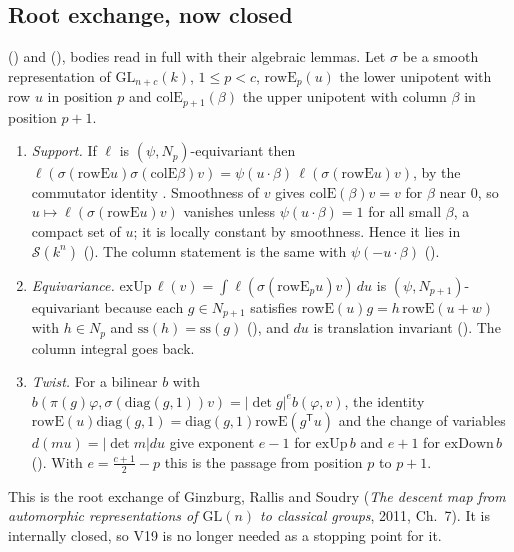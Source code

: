 \documentclass[11pt]{article}
\newcommand{\GL}{\mathrm{GL}}
\newcommand{\Sch}{\mathcal S}
\begin{document}
\subsection{Root exchange, now closed}

 () and  (), bodies read in full with their algebraic lemmas. Let $\sigma$ be a smooth representation of $\GL_{n+c}(k)$, $1\le p<c$, $\mathrm{rowE}_p(u)$ the lower unipotent with row $u$ in position $p$ and $\mathrm{colE}_{p+1}(\beta)$ the upper unipotent with column $\beta$ in position $p+1$.
\begin{enumerate}[leftmargin=*,itemsep=2pt]
\item \emph{Support.} If $\ell$ is $(\psi,N_p)$-equivariant then $\ell(\sigma(\mathrm{rowE}u)\sigma(\mathrm{colE}\beta)v)=\psi(u\cdot\beta)\,\ell(\sigma(\mathrm{rowE}u)v)$, by the commutator identity . Smoothness of $v$ gives $\mathrm{colE}(\beta)v=v$ for $\beta$ near $0$, so $u\mapsto\ell(\sigma(\mathrm{rowE}u)v)$ vanishes unless $\psi(u\cdot\beta)=1$ for all small $\beta$, a compact set of $u$; it is locally constant by smoothness. Hence it lies in $\Sch(k^n)$ (). The column statement is the same with $\psi(-u\cdot\beta)$ ().
\item \emph{Equivariance.} $\mathrm{exUp}\,\ell(v)=\int\ell(\sigma(\mathrm{rowE}_pu)v)\,du$ is $(\psi,N_{p+1})$-equivariant because each $g\in N_{p+1}$ satisfies $\mathrm{rowE}(u)g=h\,\mathrm{rowE}(u+w)$ with $h\in N_p$ and $\mathrm{ss}(h)=\mathrm{ss}(g)$ (), and $du$ is translation invariant (). The column integral goes back.
\item \emph{Twist.} For a bilinear $b$ with $b(\pi(g)\varphi,\sigma(\mathrm{diag}(g,1))v)=\lvert\det g\rvert^{e}b(\varphi,v)$, the identity $\mathrm{rowE}(u)\mathrm{diag}(g,1)=\mathrm{diag}(g,1)\mathrm{rowE}(g^{\mathsf T}u)$ and the change of variables $d(mu)=\lvert\det m\rvert du$ give exponent $e-1$ for $\mathrm{exUp}\,b$ and $e+1$ for $\mathrm{exDown}\,b$ (). With $e=\frac{c+1}{2}-p$ this is the passage from position $p$ to $p+1$.
\end{enumerate}
This is the root exchange of Ginzburg, Rallis and Soudry (\emph{The descent map from automorphic representations of $\GL(n)$ to classical groups}, 2011, Ch.~7). It is internally closed, so V19 is no longer needed as a stopping point for it.
\end{document}
